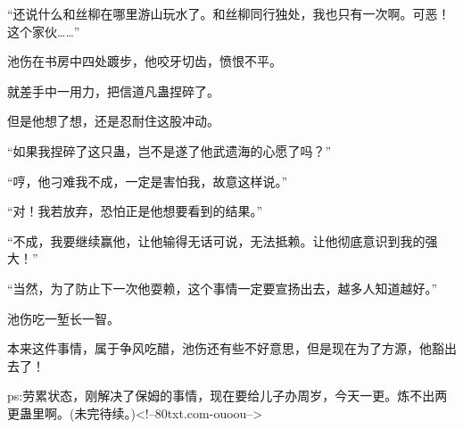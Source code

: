 \begin{this_body}
“还说什么和丝柳在哪里游山玩水了。和丝柳同行独处，我也只有一次啊。可恶！这个家伙……”

池伤在书房中四处踱步，他咬牙切齿，愤恨不平。

就差手中一用力，把信道凡蛊捏碎了。

但是他想了想，还是忍耐住这股冲动。

“如果我捏碎了这只蛊，岂不是遂了他武遗海的心愿了吗？”

“哼，他刁难我不成，一定是害怕我，故意这样说。”

“对！我若放弃，恐怕正是他想要看到的结果。”

“不成，我要继续赢他，让他输得无话可说，无法抵赖。让他彻底意识到我的强大！”

“当然，为了防止下一次他耍赖，这个事情一定要宣扬出去，越多人知道越好。”

池伤吃一堑长一智。

本来这件事情，属于争风吃醋，池伤还有些不好意思，但是现在为了方源，他豁出去了！

ps:劳累状态，刚解决了保姆的事情，现在要给儿子办周岁，今天一更。炼不出两更蛊里啊。(未完待续。)<!--80txt.com-ouoou-->

\end{this_body}

